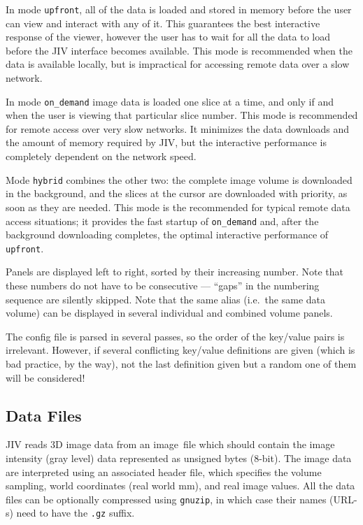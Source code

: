 \begin{itemize}
  In mode \verb+upfront+, all of the data is loaded and stored in
  memory before the user can view and interact with any of it. This
  guarantees the best interactive response of the viewer, however the
  user has to wait for all the data to load before the JIV interface
  becomes available.  This mode is recommended when the data is
  available locally, but is impractical for accessing remote data over
  a slow network.

  In mode \verb+on_demand+ image data is loaded one slice at a time,
  and only if and when the user is viewing that particular slice
  number.  This mode is recommended for remote access over very slow
  networks.  It minimizes the data downloads and the amount of memory
  required by JIV, but the interactive performance is completely
  dependent on the network speed.

  Mode \verb+hybrid+ combines the other two: the complete image volume
  is downloaded in the background, and the slices at the cursor are
  downloaded with priority, as soon as they are needed. This mode is
  the recommended for typical remote data access situations; it
  provides the fast startup of \verb+on_demand+ and, after the
  background downloading completes, the optimal interactive
  performance of \verb+upfront+.

\end{itemize}

Panels are displayed left to right, sorted by their increasing number.
Note that these numbers do not have to be consecutive --- ``gaps'' in
the numbering sequence are silently skipped.  Note that the same alias
(i.e.\ the same data volume) can be displayed in several individual
and combined volume panels.

The config file is parsed in several passes, so the order of the
key/value pairs is irrelevant. However, if several conflicting
key/value definitions are given (which is bad practice, by the way),
not the last definition given but a random one of them will be
considered!


\subsection{Data Files}
\label{sec:data-files}
\label{sec:header-files}
JIV reads 3D image data from an image~file which should contain the
image intensity (gray level) data represented as unsigned bytes
(8-bit). The image data are interpreted using an associated header
file, which specifies the volume sampling, world coordinates (real
world mm), and real image values.
All the data files can be optionally compressed using \texttt{gnuzip},
in which case their names (URL-s) need to have the \texttt{.gz}
suffix.  

